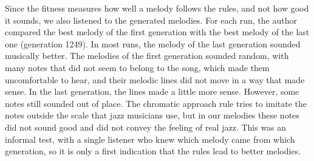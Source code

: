 Since the fitness measures how well a melody follows the rules, and not how good it sounds, we also listened to the generated melodies. For each run, the author compared the best melody of the first generation with the best melody of the last one (generation 1249). In most runs, the melody of the last generation sounded musically better. The melodies of the first generation sounded random, with many notes that did not seem to belong to the song, which made them uncomfortable to hear, and their melodic lines did not move in a way that made sense. In the last generation, the lines made a little more sense. However, some notes still sounded out of place. The chromatic approach rule tries to imitate the notes outside the scale that jazz musicians use, but in our melodies these notes did not sound good and did not convey the feeling of real jazz. This was an informal test, with a single listener who knew which melody came from which generation, so it is only a first indication that the rules lead to better melodies.
